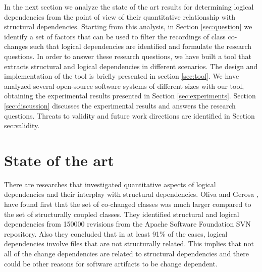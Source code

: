 \documentclass[a4paper,twoside]{article}
\begin{document}
In the next section we analyze the state of the art results for determining logical dependencies from the point of view of their quantitative relationship with structural dependencies. Starting from this analysis, in Section \ref{sec:question} we identify a set of factors that can be used to filter the recordings of class co-changes such that logical dependencies are identified and formulate the research questions. In order to answer these research questions, we have built a tool that extracts structural and logical dependencies in different scenarios. The design and implementation of the tool is briefly presented in section \ref{sec:tool}. We have analyzed several open-source software systems of different sizes with our tool, obtaining the experimental results presented in Section \ref{sec:experiments}. Section \ref{sec:discussion} discusses the experimental results and answers the research questions. Threats to validity and future work directions are identified in Section {sec:validity}.
 


\section{State of the art}
\label{sec:state}


There are researches that investigated quantitative aspects of logical dependencies and their interplay with structural dependencies. 
Oliva and Gerosa \cite{Oliva:2011:ISL:2067853.2068086}, \cite{DBLP:conf/issre/OlivaG15} have found first that the set of co-changed classes was much larger compared to the set of structurally coupled classes. They identified structural and logical dependencies from 150000 revisions from the Apache Software Foundation SVN repository. Also they concluded  that in at least 91\% of the cases, logical dependencies involve files that are not structurally related. This implies that not all of the change dependencies are related to structural dependencies and there could be other reasons for software artifacts to be change dependent.
\end{document}
